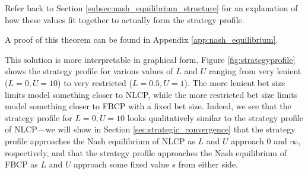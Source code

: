 \documentclass[../../main/main.tex]{subfiles}
\begin{document}
\begin{theorem}


\end{theorem}

Refer back to Section \ref{subsec:nash_equilibrium_structure} for an explanation of how these values fit together to actually form the strategy profile.

A proof of this theorem can be found in Appendix \ref{app:nash_equilibrium}.

This solution is more interpretable in graphical form. Figure \ref{fig:strategyprofile} shows the strategy profile for various values of $L$ and $U$ ranging from very lenient ($L=0, U=10$) to very restricted ($L=0.5, U=1$). The more lenient bet size limits model something closer to NLCP, while the more restricted bet size limits model something closer to FBCP with a fixed bet size. Indeed, we see that the strategy profile for $L=0, U=10$ looks qualitatively similar to the strategy profile of NLCP---we will show in Section \ref{sec:strategic_convergence} that the strategy profile approaches the Nash equilibrium of NLCP as $L$ and $U$ approach $0$ and $\infty$, respectively, and that the strategy profile approaches the Nash equilibrium of FBCP as $L$ and $U$ approach some fixed value $s$ from either side.
\end{document}
